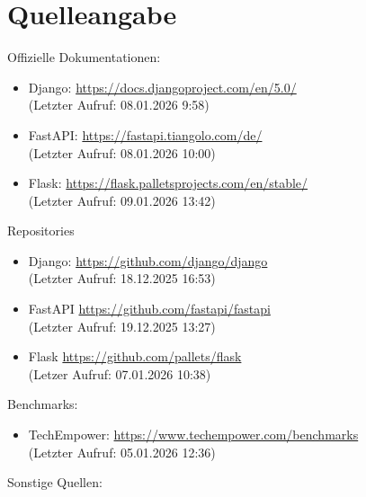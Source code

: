 \documentclass[letterpaper,11pt,leqno]{article}
\begin{document}
\section{Quelleangabe}
Offizielle Dokumentationen:
\begin{itemize}
	\item Django: \url{https://docs.djangoproject.com/en/5.0/}\\(Letzter Aufruf: 08.01.2026 9:58)
	\item FastAPI: \url{https://fastapi.tiangolo.com/de/}\\(Letzter Aufruf: 08.01.2026 10:00)
	\item Flask: \url{https://flask.palletsprojects.com/en/stable/}\\(Letzter Aufruf: 09.01.2026 13:42)
\end{itemize}
Repositories
\begin{itemize}
	\item Django: \url{https://github.com/django/django}\\(Letzter Aufruf: 18.12.2025 16:53)
	\item FastAPI \url{https://github.com/fastapi/fastapi}\\(Letzter Aufruf: 19.12.2025 13:27)
	\item Flask \url{https://github.com/pallets/flask}\\(Letzer Aufruf: 07.01.2026 10:38)
\end{itemize}
Benchmarks:
\begin{itemize}
	\item TechEmpower: \url{https://www.techempower.com/benchmarks}\\(Letzter Aufruf: 05.01.2026 12:36)
\end{itemize}
Sonstige Quellen:
\end{document}
